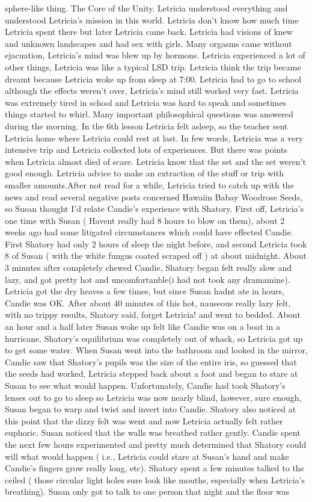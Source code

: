 \documentclass[12pt]{book}
\begin{document}
sphere-like thing. The Core of the Unity. Letricia understood everything and understood Letricia's mission in this world. Letricia don't know how much time Letricia spent there but later Letricia came back. Letricia had visions of knew and unknown landscapes and had sex with girls. Many orgasms came without ejacuation, Letricia's mind was blew up by hormons. Letricia experienced a lot of other things, Letricia was like a typical LSD trip. Letricia think the trip became dreamt because Letricia woke up from sleep at 7:00. Letricia had to go to school although the effects weren't over, Letricia's mind still worked very fast. Letricia was extremely tired in school and Letricia was hard to speak and sometimes things started to whirl. Many important philosophical questions was answered during the morning. In the 6th lesson Letricia felt asleep, so the teacher sent Letricia home where Letricia could rest at last. In few words, Letricia was a very intensive trip and Letricia collected lots of experiences. But there was points when Letricia almost died of scare. Letricia know that the set and the set weren't good enough. Letricia advice to make an extraction of the stuff or trip with smaller amounts.After not read for a while, Letricia tried to catch up with the news and read several negative posts concerned Hawaiin Babay Woodrose Seeds, so Susan thought I'd relate Candie's experience with Shatory. First off, Letricia's one time with Susan ( Havent really had 8 hours to blow on them), about 2 weeks ago had some litigated circumstances which could have effected Candie. First Shatory had only 2 hours of sleep the night before, and second Letricia took 8 of Susan ( with the white fungus coated scraped off ) at about midnight. About 3 minutes after completely chewed Candie, Shatory began felt really slow and lazy, and got pretty hot and uncomfortanble(i had not took any dramamine). Letricia got the dry heaves a few times, but since Susan hadnt ate in hours, Candie was OK. After about 40 minutes of this hot, nauseous really lazy felt, with no trippy results, Shatory said, forget Letricia! and went to bedded. About an hour and a half later Susan woke up felt like Candie was on a boat in a hurricane. Shatory's equilibrium was completely out of whack, so Letricia got up to get some water. When Susan went into the bathroom and looked in the mirror, Candie saw that Shatory's pupils was the size of the entire iris, so guessed that the seeds had worked, Letricia stepped back about a foot and began to stare at Susan to see what would happen. Unfortunately, Candie had took Shatory's lenses out to go to sleep so Letricia was now nearly blind, however, sure enough, Susan began to warp and twist and invert into Candie. Shatory also noticed at this point that the dizzy felt was went and now Letricia actually felt rather euphoric. Susan noticed that the walls was breathed rather gently. Candie spent the next few hours experimented and pretty much determined that Shatory could will what would happen ( i.e., Letricia could stare at Susan's hand and make Candie's fingers grow really long, etc). Shatory spent a few minutes talked to the ceiled ( those circular light holes sure look like mouths, especially when Letricia's breathing). Susan only got to talk to one person that night and the floor was 
\end{document}
